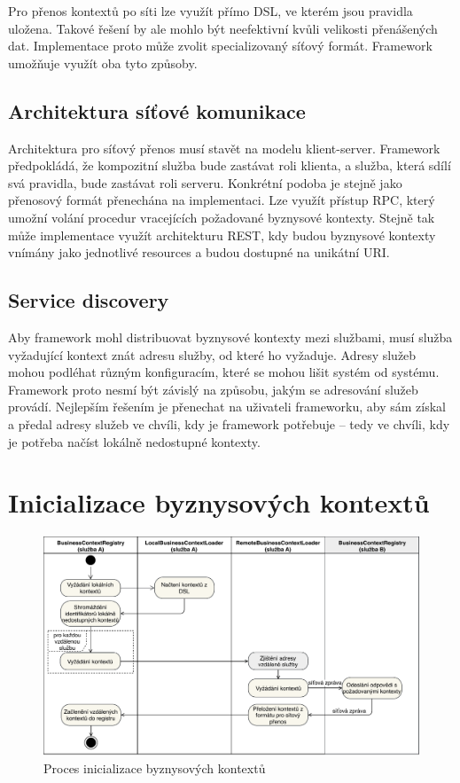 Pro přenos kontextů po síti lze využít přímo \gls{DSL}, ve kterém jsou pravidla uložena. Takové
řešení by ale mohlo být neefektivní kvůli velikosti přenášených dat. Implementace proto může zvolit
specializovaný síťový formát. Framework umožňuje využít oba tyto způsoby.

\subsection{Architektura síťové komunikace}

Architektura pro síťový přenos musí stavět na modelu klient-server. Framework předpokládá, že kompozitní
služba bude zastávat roli klienta, a služba, která sdílí svá pravidla, bude zastávat roli serveru.
Konkrétní podoba je stejně jako přenosový formát přenechána na implementaci. Lze využít přístup \gls{RPC},
který umožní volání procedur vracejících požadované byznysové kontexty. Stejně tak může implementace
využít architekturu \gls{REST}, kdy budou byznysové kontexty vnímány jako jednotlivé resources a budou
dostupné na unikátní \gls{URI}.

\subsection{Service discovery}

Aby framework mohl distribuovat byznysové kontexty mezi službami, musí služba vyžadující kontext
znát adresu služby, od které ho vyžaduje. Adresy služeb mohou podléhat různým konfiguracím,
které se mohou lišit systém od systému. Framework proto nesmí být závislý na způsobu,
jakým se adresování služeb provádí. Nejlepším řešením je přenechat na uživateli frameworku,
aby sám získal a předal adresy služeb ve chvíli, kdy je framework potřebuje -- tedy
ve chvíli, kdy je potřeba načíst lokálně nedostupné kontexty.

\section{Inicializace byznysových kontextů}

\begin{figure}
    \centering
    \includegraphics[keepaspectratio=true, width=\linewidth]{figures/business-context-loading.pdf}
    \caption{Proces inicializace byznysov\'ych kontextů}
    \label{fig:business-context-loading}
\end{figure}

